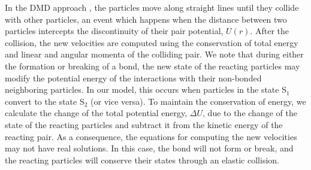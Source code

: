 \documentclass[9pt,twocolumn,twoside,lineno]{pnas-new}
\begin{document}
In the DMD approach \cite{Buldyrev_Application_2008}, the particles move along straight lines until they collide with other particles, an event which happens when the distance between two particles intercepts the discontinuity of their pair potential, $U(r)$. After the collision, the new velocities are computed using the conservation of total energy and linear and angular momenta of the colliding pair. We note that during either the formation or breaking of a bond, the new state of the reacting particles may modify the potential energy of the interactions with their non-bonded neighboring particles. In our model, this occurs when particles in the state S$_1$ convert to the state S$_2$ (or vice versa). To maintain the conservation of energy, we calculate the change of the total potential energy, $\Delta U$, due to the change of the state of the reacting particles and subtract it from the kinetic energy of the reacting pair. As a consequence, the equations for computing the new velocities \cite{Buldyrev_Application_2008} may not have real solutions. In this case, the bond will not form or break, and the reacting particles will conserve their states through an elastic collision.
\end{document}
